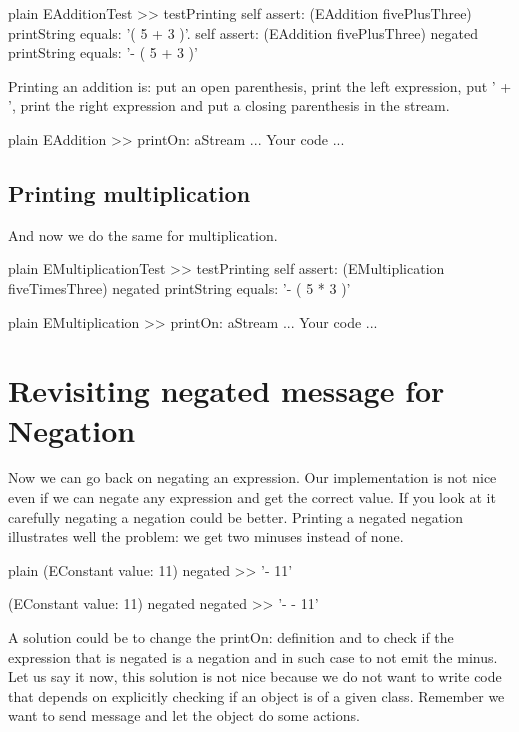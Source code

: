 \documentclass[10pt,twoside,english]{_support/latex/sbabook/sbabook}
\begin{document}
\begin{displaycode}{plain}
EAdditionTest >> testPrinting
	self assert: (EAddition fivePlusThree) printString equals:  '( 5 + 3 )'.
	self assert: (EAddition fivePlusThree) negated printString equals:  '- ( 5 + 3 )'
\end{displaycode}

Printing an addition is: put an open parenthesis, print the left expression, put ' + ', print the right expression and put a closing parenthesis in the stream. 

\begin{displaycode}{plain}
EAddition >> printOn: aStream
	... Your code ...
\end{displaycode}
\subsection{Printing multiplication}
And now we do the same for multiplication. 

\begin{displaycode}{plain}
EMultiplicationTest >> testPrinting
	self assert: (EMultiplication fiveTimesThree) negated printString equals:  '- ( 5 * 3 )'
\end{displaycode}

\begin{displaycode}{plain}
EMultiplication >> printOn: aStream
	... Your code ...
\end{displaycode}
\section{Revisiting negated message for Negation}
Now we can go back on negating an expression. Our implementation is not nice even if we can negate any expression and get the correct value. If you look at it carefully negating a negation could be better. 
Printing a negated negation illustrates well the problem: we get two minuses instead of none. 

\begin{displaycode}{plain}
(EConstant value: 11) negated 
>> '- 11'

(EConstant value: 11) negated negated
>> '- - 11'
\end{displaycode}

A solution could be to change the printOn: definition and to check if the expression that is negated is a negation 
and in such case to not emit the minus. Let us say it now, this solution is not nice because we do not want to write code
that depends on explicitly checking if an object is of a given class. Remember we want to send message and let the object do some actions. 
\end{document}
